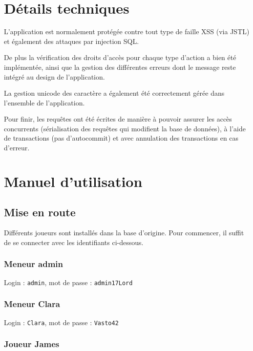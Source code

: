 \documentclass[a4paper, 11pt, titlepage]{article}
\begin{document}
\section {Détails techniques}

L'application est normalement protégée contre tout type de faille XSS (via JSTL) et également des attaques par injection SQL.

De plus la vérification des droits d'accès pour chaque type d'action a bien été implémentée, ainsi que la gestion des différentes erreurs dont le message reste intégré au design de l'application.

La gestion unicode des caractère a également été correctement gérée dans l'ensemble de l'application.

Pour finir, les requêtes ont été écrites de manière à pouvoir assurer les accès concurrents (sérialisation des requêtes qui modifient la base de données), à l'aide de transactions (pas d'autocommit) et avec annulation des transactions en cas d'erreur.




\section {Manuel d'utilisation}

\subsection {Mise en route}

Différents joueurs sont installés dans la base d'origine.
Pour commencer, il suffit de se connecter avec les identifiants ci-dessous.

\subsubsection {Meneur admin}

Login : \lstinline!admin!, mot de passe : \lstinline!admin17Lord!


\subsubsection {Meneur Clara}

Login : \lstinline!Clara!, mot de passe : \lstinline!Vasto42!


\subsubsection {Joueur James}
\end{document}
